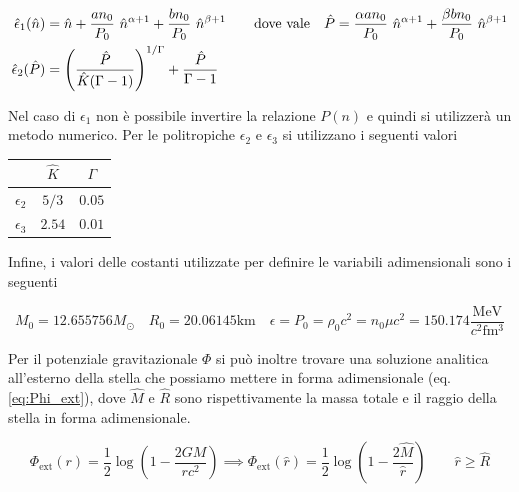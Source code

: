 \documentclass[a4paper, titlepage]{article}
\newcommand{\Punit}[0]{\frac{\unit{\mega\electronvolt}}{c^2 \unit{\femto\cubic\meter}}}
\begin{document}
\begin{subequations}
\begin{align}
    \hat \epsilon_1 (\hat n) &= \hat n + \frac{a n_0}{P_0} ~ \hat n^{\alpha + 1}
    + \frac{b n_0}{P_0} ~ \hat n^{\beta + 1}
    \quad \quad {\rm dove~vale} \quad
    \hat P = \frac{\alpha a n_0}{P_0} ~ \hat n^{\alpha + 1}
    + \frac{\beta b n_0}{P_0} ~ \hat n^{\beta + 1} \label{eq:e1_ad} \\
    \hat \epsilon_2 (\hat P)
    &= \left(\frac{\hat P}{\hat K (\Gamma - 1)} \right)^{1/\Gamma}
    + \frac{\hat P}{\Gamma - 1} \label{eq:e23_ad}
\end{align}
\end{subequations}

Nel caso di $\epsilon_1$ non è possibile invertire la relazione $P(n)$ e quindi
si utilizzerà un metodo numerico.
Per le politropiche $\epsilon_2$ e $\epsilon_3$ si utilizzano i seguenti valori

\begin{table}[h]
    \centering
    \begin{tabular}{c|c|c} 
         & $\hat K$ & $\Gamma$ \\
        \hline
        $\epsilon_2$ & $5 / 3$ & $0.05$ \\
        \hline
        $\epsilon_3$ & $2.54$ & $0.01$ \\
    \end{tabular}
\end{table}

Infine, i valori delle costanti utilizzate per definire le variabili
adimensionali sono i seguenti

\begin{equation}
    M_0 = 12.655756 M_\odot \quad R_0 = 20.06145 \unit{\kilo\meter} \quad
    \epsilon = P_0 = \rho_0 c^2 = n_0 \mu c^2 = 150.174 \Punit
    \label{eq:val_cost}
\end{equation}

Per il potenziale gravitazionale $\Phi$ si può inoltre trovare una soluzione
analitica all'esterno della stella che possiamo mettere in forma adimensionale
(eq. \ref{eq:Phi_ext}), dove $\hat{M}$ e $\hat R$ sono rispettivamente la massa
totale e il raggio della stella in forma adimensionale.

\begin{equation}
    \Phi_\text{ext} (r) = \frac{1}{2} \log(1 - \frac{2 G M}{r c^2})
    \implies \Phi_\text{ext} (\hat r) = \frac{1}{2}
    \log(1 - \frac{2 \hat{M}}{\hat r}) \quad \quad \hat r \geq \hat{R}
    \label{eq:Phi_ext}
\end{equation}
\end{document}
